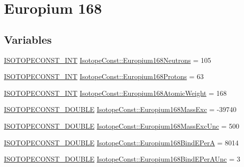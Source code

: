 \hypertarget{group___isotope_const-_europium-_eu168}{}\section{Europium 168}
\label{group___isotope_const-_europium-_eu168}
\subsection*{Variables}
\begin{DoxyCompactItemize}
\item 
\mbox{\hyperlink{group___isotope_const-_macros_ga5f18360b3e99483a35c32d789e62621c}{I\+S\+O\+T\+O\+P\+E\+C\+O\+N\+S\+T\+\_\+\+I\+NT}} \mbox{\hyperlink{group___isotope_const-_europium-_eu168_ga14e0d6fd1dddc3ca91c4bf6614e9ad8f}{Isotope\+Const\+::\+Europium168\+Neutrons}} = 105
\item 
\mbox{\hyperlink{group___isotope_const-_macros_ga5f18360b3e99483a35c32d789e62621c}{I\+S\+O\+T\+O\+P\+E\+C\+O\+N\+S\+T\+\_\+\+I\+NT}} \mbox{\hyperlink{group___isotope_const-_europium-_eu168_gab258c748af3434c676b278e7117ef149}{Isotope\+Const\+::\+Europium168\+Protons}} = 63
\item 
\mbox{\hyperlink{group___isotope_const-_macros_ga5f18360b3e99483a35c32d789e62621c}{I\+S\+O\+T\+O\+P\+E\+C\+O\+N\+S\+T\+\_\+\+I\+NT}} \mbox{\hyperlink{group___isotope_const-_europium-_eu168_ga82ebe05e17123353bb9940b9b6e55fa0}{Isotope\+Const\+::\+Europium168\+Atomic\+Weight}} = 168
\item 
\mbox{\hyperlink{group___isotope_const-_macros_ga8f45a7272ce02c0b4c65c44636ed719a}{I\+S\+O\+T\+O\+P\+E\+C\+O\+N\+S\+T\+\_\+\+D\+O\+U\+B\+LE}} \mbox{\hyperlink{group___isotope_const-_europium-_eu168_ga4434c25676f2402bf2757ea0f84067ec}{Isotope\+Const\+::\+Europium168\+Mass\+Exc}} = -\/39740
\item 
\mbox{\hyperlink{group___isotope_const-_macros_ga8f45a7272ce02c0b4c65c44636ed719a}{I\+S\+O\+T\+O\+P\+E\+C\+O\+N\+S\+T\+\_\+\+D\+O\+U\+B\+LE}} \mbox{\hyperlink{group___isotope_const-_europium-_eu168_gaf4782cc787aa597dc03a58fc62d00950}{Isotope\+Const\+::\+Europium168\+Mass\+Exc\+Unc}} = 500
\item 
\mbox{\hyperlink{group___isotope_const-_macros_ga8f45a7272ce02c0b4c65c44636ed719a}{I\+S\+O\+T\+O\+P\+E\+C\+O\+N\+S\+T\+\_\+\+D\+O\+U\+B\+LE}} \mbox{\hyperlink{group___isotope_const-_europium-_eu168_ga75d37ff1e4c3d96d4d35cb948c880b3f}{Isotope\+Const\+::\+Europium168\+Bind\+E\+PerA}} = 8014
\item 
\mbox{\hyperlink{group___isotope_const-_macros_ga8f45a7272ce02c0b4c65c44636ed719a}{I\+S\+O\+T\+O\+P\+E\+C\+O\+N\+S\+T\+\_\+\+D\+O\+U\+B\+LE}} \mbox{\hyperlink{group___isotope_const-_europium-_eu168_ga9bcd30bf7b9aad2326c2b4fe610b8f5c}{Isotope\+Const\+::\+Europium168\+Bind\+E\+Per\+A\+Unc}} = 3

\end{DoxyCompactItemize}
